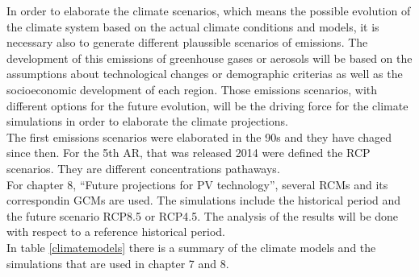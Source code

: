 In order to elaborate the climate scenarios, which means the possible evolution of the climate system based on the actual climate conditions and models, it is necessary also to generate different plaussible scenarios of emissions. The development of this emissions of greenhouse gases or aerosols will be based on the assumptions about technological changes or demographic criterias as well as the socioeconomic development of each region. Those emissions scenarios, with different options for the future evolution, will be the driving force for the climate simulations in order to elaborate the climate projections.\\

The first emissions scenarios were elaborated in the 90s and they have chaged since then. For the 5th AR, that was released 2014 were defined the RCP scenarios. They are  different concentrations pathaways.\\

For chapter 8, ``Future projections for PV technology'', several RCMs and its correspondin GCMs are used. The simulations include the historical period and the future scenario RCP8.5 or RCP4.5. The analysis of the results will be done with respect to a reference historical period.\\

In table \ref{climatemodels} there is a summary of the climate models and the simulations that are used in chapter 7 and 8.\\

